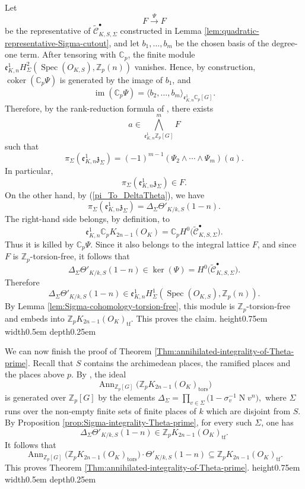 \documentclass[a4paper,11pt]{article}
\newenvironment{proof}[1][Proof]{\begin{trivlist}
\item[\hskip \labelsep {\bfseries #1}]}{\end{trivlist}}
\newcommand{\qed}{\nobreak \ifvmode \relax \else
    \ifdim\lastskip<1.5em \hskip-\lastskip
     \hskip1.5em plus0em minus0.5em \fi \nobreak
      \vrule height0.75em width0.5em depth0.25em\fi}
\begin{document}
\begin{proof}
Let
\[
F\stackrel{\Psi}{\longrightarrow}F
\]
be the representative of
\(\widetilde{\mathcal C}_{K,S,\Sigma}^{\bullet}\) constructed in Lemma
\ref{lem:quadratic-representative-Sigma-cutout}, and let
\(b_1,\ldots,b_m\) be the chosen basis of the degree-one term. After tensoring
with \(\mathbb C_p\), the finite module
\(
\mathfrak e^1_{K,n}
H^2_{\Sigma}(\operatorname{Spec}(O_{K,S}),\mathbb Z_p(n))
\)
vanishes. Hence, by construction,
\(
\operatorname{coker}(\mathbb C_p\Psi)
\)
is generated by the image of \(b_1\), and
\[
\operatorname{im}(\mathbb C_p\Psi)
=
\langle b_2,\ldots,b_m\rangle_{\mathfrak e^1_{K,n}\mathbb C_p[G]}.
\]
Therefore, by the rank-reduction formula of \cite[Lemma 4.3]{BKS0}, there exists
\[
a\in
\bigwedge_{\mathfrak e^1_{K,n}\mathbb Z_p[G]}^m F
\]
such that
\[
\pi_{\Sigma}(\mathfrak e^1_{K,n}\mathfrak z_{\Sigma})
=
(-1)^{m-1}
(\Psi_2\wedge\cdots\wedge\Psi_m)(a).
\]
In particular,
\[
\pi_{\Sigma}(\mathfrak e^1_{K,n}\mathfrak z_{\Sigma})\in F.
\]
On the other hand, by (\ref{pi_To_DeltaTheta}), we have
\[
\pi_{\Sigma}(\mathfrak e^1_{K,n}\mathfrak z_{\Sigma})
=
\Delta_{\Sigma}\Theta'_{K/k,S}(1-n).
\]
The right-hand side belongs, by definition, to
\[
\mathfrak e^1_{K,n}\mathbb C_pK_{2n-1}(O_K)
=
\mathbb C_p
H^0\bigl(\widetilde{\mathcal C}_{K,S,\Sigma}^{\bullet}\bigr).
\]
Thus it is killed by \(\mathbb C_p\Psi\). Since it also belongs to the integral
lattice \(F\), and since \(F\) is \(\mathbb Z_p\)-torsion-free, it follows that
\[
\Delta_{\Sigma}\Theta'_{K/k,S}(1-n)
\in
\ker(\Psi)
=
H^0\bigl(\widetilde{\mathcal C}_{K,S,\Sigma}^{\bullet}\bigr).
\]
Therefore
\[
\Delta_{\Sigma}\Theta'_{K/k,S}(1-n)
\in
\mathfrak e^1_{K,n}
H^1_{\Sigma}(\operatorname{Spec}(O_{K,S}),\mathbb Z_p(n)).
\]
By Lemma \ref{lem:Sigma-cohomology-torsion-free}, this module is
\(\mathbb Z_p\)-torsion-free and embeds into
\(
\mathbb Z_pK_{2n-1}(O_K)_{\mathrm{tf}}.
\)
This proves the claim.\qed
\end{proof}
We can now finish the proof of Theorem
\ref{Thm:annihilated-integrality-of-Theta-prime}.
Recall that \(S\) contains the archimedean places, the ramified places and the places above \(p\).
By \cite[Lemma 6.9(2)]{GreitherPopescu}, the ideal
\[
\operatorname{Ann}_{\mathbb Z_p[G]}
\bigl(\mathbb Z_pK_{2n-1}(O_K)_{\mathrm{tors}}\bigr)
\]
is generated over \(\mathbb Z_p[G]\) by the elements
\(
\Delta_{\Sigma}
=
\prod_{v\in\Sigma}
\bigl(1-\sigma_v^{-1}\operatorname N v^n\bigr),
\)
where \(\Sigma\) runs over the non-empty finite sets of finite places of \(k\)
which are disjoint from \(S\).
By Proposition \ref{prop:Sigma-integrality-Theta-prime}, for every such
\(\Sigma\), one has
\[
\Delta_{\Sigma}\Theta'_{K/k,S}(1-n)
\in
\mathbb Z_pK_{2n-1}(O_K)_{\mathrm{tf}}.
\]
It follows that
\[
\operatorname{Ann}_{\mathbb Z_p[G]}
\bigl(\mathbb Z_pK_{2n-1}(O_K)_{\mathrm{tors}}\bigr)
\cdot
\Theta'_{K/k,S}(1-n)
\subseteq
\mathbb Z_pK_{2n-1}(O_K)_{\mathrm{tf}}.
\]
This proves Theorem
\ref{Thm:annihilated-integrality-of-Theta-prime}.\qed
\end{document}

